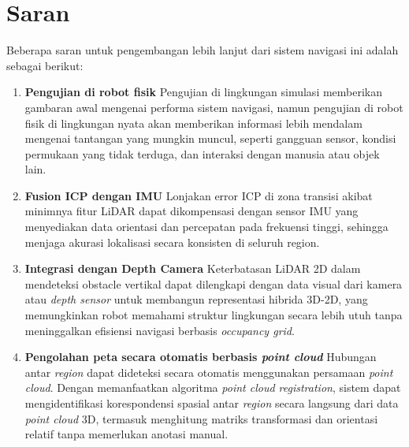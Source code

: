 \section{Saran}
\label{chap:saran}

Beberapa saran untuk pengembangan lebih lanjut dari sistem navigasi ini
adalah sebagai berikut:

\begin{enumerate}
    \item \textbf{Pengujian di robot fisik} \newline Pengujian di lingkungan simulasi memberikan gambaran awal mengenai performa sistem navigasi, namun pengujian di robot fisik di lingkungan nyata akan memberikan informasi lebih mendalam mengenai tantangan yang mungkin muncul, seperti gangguan sensor, kondisi permukaan yang tidak terduga, dan interaksi dengan manusia atau objek lain.

    \item \textbf{Fusion ICP dengan IMU} \newline Lonjakan error ICP di zona
    transisi akibat minimnya fitur LiDAR dapat dikompensasi dengan
    sensor IMU yang menyediakan data orientasi dan percepatan pada
    frekuensi tinggi, sehingga menjaga akurasi lokalisasi secara
    konsisten di seluruh region.

    \item \textbf{Integrasi dengan Depth Camera} \newline
    Keterbatasan LiDAR 2D dalam mendeteksi obstacle vertikal dapat
    dilengkapi dengan data visual dari kamera atau \emph{depth sensor}
    untuk membangun representasi hibrida 3D-2D, yang memungkinkan
    robot memahami struktur lingkungan secara lebih utuh tanpa
    meninggalkan efisiensi navigasi berbasis \emph{occupancy grid}.

    \item \textbf{Pengolahan peta secara otomatis berbasis \emph{point cloud}} \newline
    Hubungan antar \emph{region} dapat dideteksi secara otomatis menggunakan
    persamaan \emph{point cloud}. Dengan memanfaatkan algoritma \emph{point
    cloud registration}, sistem dapat
    mengidentifikasi korespondensi spasial antar \emph{region} secara langsung
    dari data \emph{point cloud} 3D, termasuk menghitung matriks transformasi
    dan orientasi relatif tanpa memerlukan anotasi manual.
\end{enumerate}
